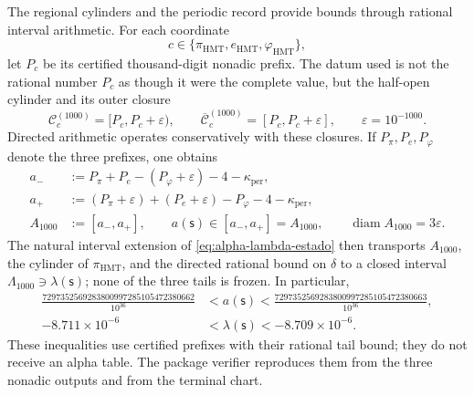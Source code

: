 The regional cylinders and the periodic record provide bounds through
rational interval arithmetic. For each coordinate
\[
 c\in\{\pi_{\mathrm{HMT}},e_{\mathrm{HMT}},\varphi_{\mathrm{HMT}}\},
\]
let \(P_c\) be its certified thousand-digit nonadic prefix. The datum used is
not the rational number \(P_c\) as though it were the complete value, but the
half-open cylinder and its outer closure
\[
 \mathcal C_c^{(1000)}=[P_c,P_c+\varepsilon),
 \qquad
 \overline{\mathcal C}_c^{(1000)}=[P_c,P_c+\varepsilon],
 \qquad \varepsilon=10^{-1000}.
\]
Directed arithmetic operates conservatively with these closures. If
\(P_\pi,P_e,P_\varphi\) denote the three prefixes, one obtains
\begin{equation}
\begin{aligned}
 a_-&:=P_\pi+P_e-(P_\varphi+\varepsilon)-4-
       \kappa_{\mathrm{per}},\\
 a_+&:=(P_\pi+\varepsilon)+(P_e+\varepsilon)-P_\varphi-4-
       \kappa_{\mathrm{per}},\\
 A_{1000}&:=[a_-,a_+],
 \qquad a(\mathsf s)\in[a_-,a_+]=A_{1000},
 \qquad \operatorname{diam}A_{1000}=3\varepsilon.
\end{aligned}
\label{eq:alpha-propagacion-colas-rev08}
\end{equation}
The natural interval extension of \eqref{eq:alpha-lambda-estado} then
transports \(A_{1000}\), the cylinder of \(\pi_{\mathrm{HMT}}\), and the
directed rational bound on \(\delta\) to a closed interval
\(\Lambda_{1000}\ni\lambda(\mathsf s)\); none of the three tails is frozen.
In particular,
\begin{equation}
\begin{aligned}
 \frac{7297352569283800997285105472380662}{10^{36}}
 &<a(\mathsf s)<
 \frac{7297352569283800997285105472380663}{10^{36}},\\
 -8.711\mathbin{\times}10^{-6}
 &<\lambda(\mathsf s)<-8.709\mathbin{\times}10^{-6}.
\end{aligned}
 \label{eq:alpha-cotas-precoordenada-lambda}
\end{equation}
These inequalities use certified prefixes with their rational tail bound;
they do not receive an alpha table. The package verifier reproduces them from
the three nonadic outputs and from the terminal chart.

